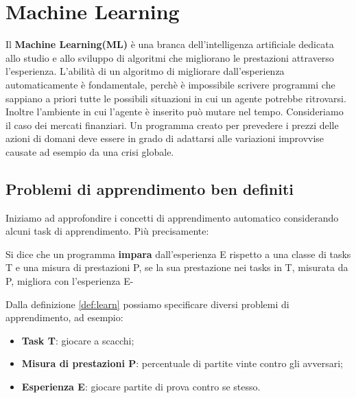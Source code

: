 \section{Machine Learning}
Il \textbf{Machine Learning(ML)} è una branca dell'intelligenza artificiale dedicata allo studio e allo sviluppo
di algoritmi che migliorano le prestazioni attraverso l'esperienza\cite{mlwiki}. L'abilità di un algoritmo di migliorare dall'esperienza
automaticamente è fondamentale, perchè è impossibile scrivere programmi  che sappiano a priori tutte le possibili situazioni in cui 
un agente potrebbe ritrovarsi. Inoltre l'ambiente in cui l'agente è inserito può mutare nel tempo\cite{aima}. Consideriamo il caso dei mercati finanziari.
Un programma creato per prevedere i prezzi delle azioni di domani deve essere in grado  di adattarsi alle variazioni improvvise causate ad esempio
da una crisi globale.
\subsection{Problemi di apprendimento ben definiti}
Iniziamo ad approfondire i concetti di apprendimento automatico considerando alcuni task di apprendimento. Più precisamente:
\begin{defn}\label{def:learn}
  Si dice che un programma \textbf{impara} dall'esperienza E rispetto a una classe di tasks T e una misura di prestazioni P,
  se la sua prestazione nei tasks in T, misurata da P, migliora con l'esperienza E-
\end{defn}
Dalla definizione \ref{def:learn} possiamo specificare diversi problemi di apprendimento, ad esempio\cite{Mitchell97}:
\begin{itemize}
  \item \textbf{Task T}: giocare a scacchi;
  \item \textbf{Misura di prestazioni P}: percentuale di partite vinte contro gli avversari;
  \item \textbf{Esperienza E}: giocare partite di prova contro se stesso.
\end{itemize}


